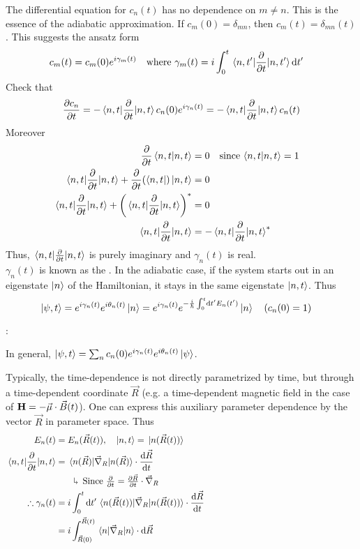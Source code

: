 \documentclass[12pt,a4paper,titlepage]{article}
\newcommand{\ul}[1]{\underline{\smash{#1}}} %
\newcommand{\explain}[1]{%
	\quad\rotatebox[origin=c]{180}{\enskip$\Lsh$}\hfill
	\begin{minipage}[t]{\dimexpr\linewidth-8em\relax}
	#1
	\end{minipage}\hspace{4em}\bigskip
}
\newcommand{\aside}[1]{%
	\ul{Aside}:\hfill
	\begin{minipage}[t]{\dimexpr\linewidth-8em\relax}
	#1
	\end{minipage}\hspace{4em}\bigskip
}
\begin{document}
The differential equation for $c_{n}(t)$ has no dependence on $m\neq n$. This is the essence of the adiabatic approximation. If $c_{m}(0)=\delta_{mn}$, then $c_{m}(t)=\delta_{mn}(t)$. This suggests the ansatz form
\begin{equation}
c_{m}(t)=c_{m}(0)e^{i\gamma_{m}(t)}\qq{where $\gamma_{m}(t)=i\int_{0}^{t}\mel{n,t'}{\pdv{t}}{n,t'}\dd{t'}$}
\end{equation}
Check that
\begin{equation}
\pdv{c_{n}}{t}=-\mel{n,t}{\pdv{t}}{n,t}c_{n}(0)e^{i\gamma_{n}(t)}=-\mel{n,t}{\pdv{t}}{n,t}c_{n}(t)
\end{equation}
Moreover
\begin{equation}
\begin{aligned}
\pdv{t}\ip{n,t}&=0\qq{since $\ip{n,t}=1$}\\
\mel{n,t}{\pdv{t}}{n,t}+\pdv{t}(\bra{n,t})\ket{n,t}&=0\\
\mel{n,t}{\pdv{t}}{n,t}+\qty(\mel{n,t}{\pdv{t}}{n,t})^{*}&=0\\
\mel{n,t}{\pdv{t}}{n,t}&=-\mel{n,t}{\pdv{t}}{n,t}^{*}
\end{aligned}
\end{equation}
Thus, $\mel{n,t}{\pdv{t}}{n,t}$ is purely imaginary and $\gamma_{n}(t)$ is real.\\

$\gamma_{n}(t)$ is known as the \ul{Berry phase}. In the adiabatic case, if the system starts out in an eigenstate $\ket{n}$ of the Hamiltonian, it stays in the same eigenstate $\ket{n,t}$. Thus
\begin{equation}
\ket{\psi,t}=e^{i\gamma_{n}(t)}e^{i\theta_{n}(t)}\ket{n}=e^{i\gamma_{n}(t)}e^{-\frac{i}{\hbar}\int_{0}^{t}\dd{t'}E_{n}(t')}\ket{n}\qq{($c_{n}(0)=1$)}
\end{equation}

\aside{In general, $\ket{\psi,t}=\sum_{n}c_{n}(0)e^{i\gamma_{n}(t)}e^{i\theta_{n}(t)}\ket{\psi}$.}

Typically, the time-dependence is not directly parametrized by time, but through a time-dependent coordinate $\vec{R}$ (e.g. a time-dependent magnetic field in the case of $\vb{H}=-\vec{\mu}\cdot\vec{B}(t)$). One can express this auxiliary parameter dependence by the vector $\vec{R}$ in parameter space. Thus
\begin{equation}
\begin{aligned}
E_{n}(t)&=E_{n}(\vec{R}(t)),\quad\ket{n,t}=\ket*{n(\vec{R}(t))}\\
\mel{n,t}{\pdv{t}}{n,t}&=\mel*{n(\vec{R})}{\vec{\nabla}_{R}}{n(\vec{R})}\cdot\dv{\vec{R}}{t}\\
&\quad\explain{Since $\pdv{t}=\pdv{\vec{R}}{t}\cdot\vec{\nabla}_{R}$}\\
\therefore\gamma_{n}(t)&=i\int_{0}^{t}\dd{t'}\mel*{n(\vec{R}(t))}{\vec{\nabla}_{R}}{n(\vec{R}(t))}\cdot\dv{\vec{R}}{t}\\
&=i\int_{\vec{R}(0)}^{\vec{R}(t)}\mel{n}{\vec{\nabla}_{R}}{n}\cdot\dd{\vec{R}}
\end{aligned}
\end{equation}
\end{document}
